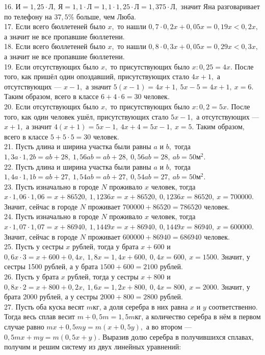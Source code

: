 \documentclass[12pt]{article}
\begin{document}
16. $\text{И}=1,25\cdot\text{Л},\ \text{Я}=1,1\cdot\text{Л}=1,1\cdot1,25\cdot\text{Л}=1,375\cdot\text{Л},$ значит Яна разговаривает по телефону на $37,5\%$ больше, чем Люба.\\
17. Если всего бюллетеней было $x,$ то нашли $0,7\cdot0,2x+0,05x=0,19x<0,2x,$ а значит не все пропавшие бюллетени.\\
18. Если всего бюллетеней было $x,$ то нашли $0,8\cdot0,3x+0,05x=0,29x<0,3x,$ а значит не все пропавшие бюллетени.\\
19. Если отсутствующих было $x,$ то присутствующих было $x:0,25=4x.$ После того, как пришёл один опоздавший, присутствующих стало $4x+1,$ а отсутствующих --- $x-1,$ а значит $5(x-1)=4x+1,\ 5x-5=4x+1,\ x=6.$ Таким образом, всего в классе $6+4\cdot6=30$ человек.\\
20. Если отсутствующих было $x,$ то присутствующих было $x:0,2=5x.$ После того, как один человек ушёл, присутствующих стало $5x-1,$ а отсутствующих --- $x+1,$ а значит $4(x+1)=5x-1,\ 4x+4=5x-1,\ x=5.$ Таким образом, всего в классе $5+5\cdot5=30$ человек.\\
21. Пусть длина и ширина участка были равны $a$ и $b,$ тогда $1,3a\cdot1,2b=ab+28,\ 1,56ab=ab+28,\ 0,56ab=28,\ ab=50\text{м}^2.$\\
22. Пусть длина и ширина участка были равны $a$ и $b,$ тогда $1,4a\cdot1,1b=ab+27,\ 1,54ab=ab+27,\ 0,54ab=27,\ ab=50\text{м}^2.$\\
23. Пусть изначально в городе $N$ проживало $x$ человек, тогда $x\cdot1,06\cdot1,06=x+86520,\ 1,1236x=x+86520,\ 0,1236x=86520,\ x=700000.$ Значит, сейчас в городе $N$ проживает $700000+86520=786520$ человек.\\
24. Пусть изначально в городе $N$ проживало $x$ человек, тогда $x\cdot1,07\cdot1,07=x+86940,\ 1,1449x=x+86940,\ 0,1449x=86940,\ x=600000.$ Значит, сейчас в городе $N$ проживает $600000+86940=686940$ человек.\\
25. Пусть у сестры $x$ рублей, тогда у брата $x+600$ и $0,6x\cdot3=x+600+0,4x,\ 1,8x=1,4x+600,\ 0,4x=600,\ x=1500.$ Значит, у сестры 1500 рублей, а у брата $1500+600=2100$ рублей.\\
26. Пусть у брата $x$ рублей, тогда у сестры $x+800$ и $0,8x\cdot2=x+800+0,2x,\ 1,6x=1,2x+800,\ 0,4x=800,\ x=2000.$ Значит, у брата 2000 рублей, а у сестры $2000+800=2800$ рублей.\\
27. Пусть оба куска весят $m$кг, а доля серебра в них равна $x$ и $y$ соответственно. Тогда весь сплав весит $m+0,5m=1,5m$кг, а количество серебра в нём в первом случае равно $mx+0,5my=m(x+0,5y),$ а во втором --- $0,5mx+my=m(0,5x+y).$ Выразив долю серебра в получившихся сплавах, получим и решим систему из двух линейных уравнений:\\
\end{document}
